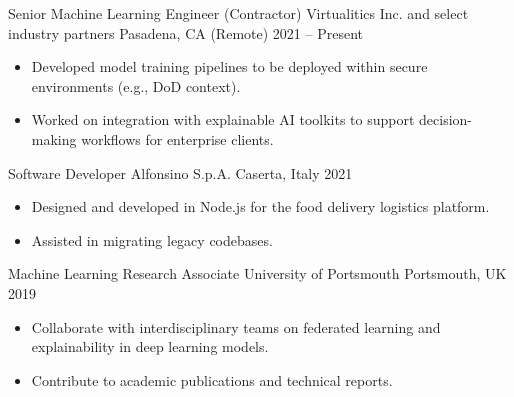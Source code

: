 

\cventry
  {Senior Machine Learning Engineer (Contractor)}
  {Virtualitics Inc. and select industry partners}
  {Pasadena, CA (Remote)}
  {2021 -- Present}
  {
    \begin{itemize}
      \item Developed model training pipelines to be deployed within secure environments (e.g., DoD context).
      \item Worked on integration with explainable AI toolkits to support decision-making workflows for enterprise clients.
    \end{itemize}
  }
  {}

\cventry
  {Software Developer}
  {Alfonsino S.p.A.}
  {Caserta, Italy}
  {2021}
  {
    \begin{itemize}
      \item Designed and developed in Node.js for the food delivery logistics platform.
      \item Assisted in migrating legacy codebases.
    \end{itemize}
  }
  {}

  \cventry
  {Machine Learning Research Associate}
  {University of Portsmouth}
  {Portsmouth, UK}
  {2019}
  {
    \begin{itemize}
      \item Collaborate with interdisciplinary teams on federated learning and explainability in deep learning models.
      \item Contribute to academic publications and technical reports.
    \end{itemize}
  }
  {}
